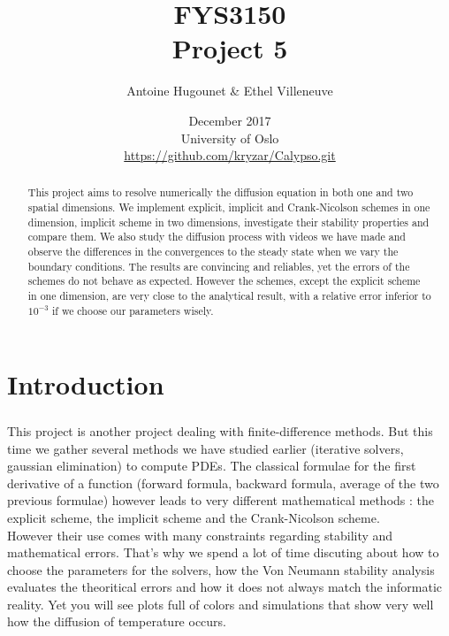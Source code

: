 \documentclass[a4paper, twoside, 11pt]{report}
\title{FYS3150\\Project 5}
\author{Antoine Hugounet \& Ethel Villeneuve}
\date{December 2017 \\University of Oslo \\ \url{https://github.com/kryzar/Calypso.git}}
\theoremstyle{theorem}
\theoremstyle{remark}
\theoremstyle{exemple}
\begin{document}
\maketitle


\begin{abstract}

    This project aims to resolve numerically the diffusion equation in both one and two spatial dimensions. We implement explicit, implicit and Crank-Nicolson schemes in one dimension, implicit scheme in two dimensions, investigate their stability properties and compare them. We also study the diffusion process with videos we have made and observe the differences in the convergences to the steady state when we vary the boundary conditions. The results are convincing and reliables, yet the errors of the schemes do not behave as expected. However the schemes, except the explicit scheme in one dimension, are very close to the analytical result, with a relative error inferior to ${10}^{-3}$ if we choose our parameters wisely.

\end{abstract}


\tableofcontents


\chapter*{Introduction}

    \paragraph{}This project is another project dealing with finite-difference methods. But this time we gather several methods we have studied earlier (iterative solvers, gaussian elimination) to compute PDEs. The classical formulae for the first derivative of a function (forward formula, backward formula, average of the two previous formulae) however leads to very different mathematical methods : the explicit scheme, the implicit scheme and the Crank-Nicolson scheme. \\
    However their use comes with many constraints regarding stability and mathematical errors. That's why we spend a lot of time discuting about how to choose the parameters for the solvers, how the Von Neumann stability analysis evaluates the theoritical errors and how it does not always match the informatic reality. Yet you will see plots full of colors and simulations that show very well how the diffusion of temperature occurs.
\end{document}
